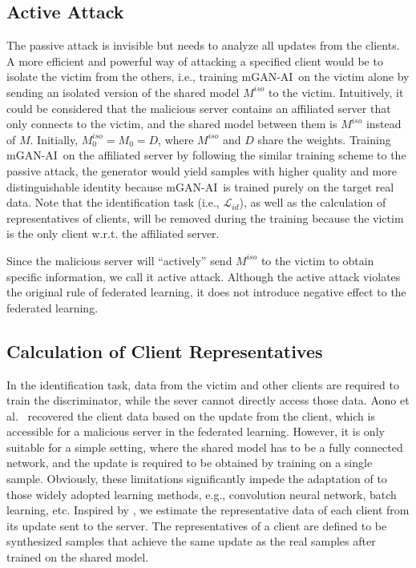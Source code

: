 \documentclass[10pt, conference, letterpaper]{IEEEtran}
\newcommand{\alg}{mGAN-AI}
\begin{document}
\subsection{Active Attack}
\label{subsec:active}

The passive attack is invisible but needs to analyze all updates from the clients. A more efficient and powerful way of attacking a specified client would be to isolate the victim from the others, i.e., training \alg~on the victim alone by sending an isolated version of the shared model $M^{iso}$ to the victim. Intuitively, it could be considered that the malicious server contains an affiliated server that only connects to the victim, and the shared model between them is $M^{iso}$ instead of $M$. Initially, $M^{iso}_0 = M_0 = D$, where $M^{iso}$ and $D$ share the weights. Training \alg~on the affiliated server by following the similar training scheme to the passive attack, the generator would yield samples with higher quality and more distinguishable identity because \alg~is trained purely on the target real data. Note that the identification task (i.e., $\mathcal{L}_{id}$), as well as the calculation of representatives of clients, will be removed during the training because the victim is the only client w.r.t. the affiliated server.

Since the malicious server will ``actively'' send $M^{iso}$ to the victim to obtain specific information, we call it active attack. Although the active attack violates the original rule of federated learning, it does not introduce negative effect to the federated learning.

\subsection{Calculation of Client Representatives}
\label{subsec:client}
In the identification task, data from the victim and other clients are required to train the discriminator, while the sever cannot directly access those data. Aono et al.~\cite{aono2017privacy} recovered the client data based on the update from the client, which is accessible for a malicious server in the federated learning.
However, it is only suitable for a simple setting, where the shared model has to be a fully connected network, and the update is required to be obtained by training on a single sample.
Obviously, these limitations significantly impede the adaptation of \cite{aono2017privacy} to those widely adopted learning methods, e.g., convolution neural network, batch learning, etc.
Inspired by \cite{aono2017privacy}, we estimate the representative data of each client from its update sent to the server. The representatives of a client are defined to be synthesized samples that achieve the same update as the real samples after trained on the shared model.
\end{document}
